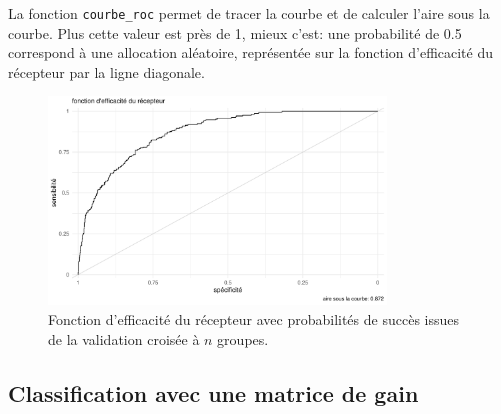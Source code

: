\documentclass[
  11pt,
  letterpaper,
]{scrbook}
\newenvironment{Shaded}{\begin{snugshade}}{\end{snugshade}}
\newcommand{\AttributeTok}[1]{\textcolor[rgb]{0.40,0.45,0.13}{#1}}
\newcommand{\CommentTok}[1]{\textcolor[rgb]{0.37,0.37,0.37}{#1}}
\newcommand{\ConstantTok}[1]{\textcolor[rgb]{0.56,0.35,0.01}{#1}}
\newcommand{\DocumentationTok}[1]{\textcolor[rgb]{0.37,0.37,0.37}{\textit{#1}}}
\newcommand{\FunctionTok}[1]{\textcolor[rgb]{0.28,0.35,0.67}{#1}}
\newcommand{\NormalTok}[1]{\textcolor[rgb]{0.00,0.23,0.31}{#1}}
\newcommand{\OtherTok}[1]{\textcolor[rgb]{0.00,0.23,0.31}{#1}}
\newcommand{\SpecialCharTok}[1]{\textcolor[rgb]{0.37,0.37,0.37}{#1}}
\theoremstyle{definition}
\theoremstyle{remark}
\begin{document}
La fonction \texttt{courbe\_roc} permet de tracer la courbe et de
calculer l'aire sous la courbe. Plus cette valeur est près de 1, mieux
c'est: une probabilité de 0.5 correspond à une allocation aléatoire,
représentée sur la fonction d'efficacité du récepteur par la ligne
diagonale.

\begin{figure}[ht!]

{\centering \includegraphics[width=0.8\textwidth,height=\textheight]{reglogistique_files/figure-pdf/fig-roccurve-1.pdf}

}

\caption{\label{fig-roccurve}Fonction d'efficacité du récepteur avec
probabilités de succès issues de la validation croisée à \(n\) groupes.}

\end{figure}

\begin{Shaded}
\end{Shaded}

\hypertarget{classification-avec-une-matrice-de-gain}{%
\subsection{Classification avec une matrice de
gain}\label{classification-avec-une-matrice-de-gain}}
\end{document}

